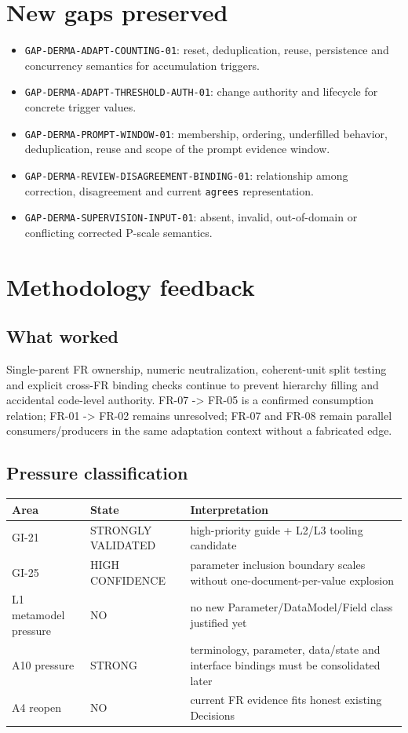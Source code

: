 \documentclass[11pt,a4paper]{article}
\begin{document}
\section{New gaps preserved}
\begin{itemize}
\item \texttt{GAP-DERMA-ADAPT-COUNTING-01}: reset, deduplication, reuse, persistence and concurrency semantics for accumulation triggers.
\item \texttt{GAP-DERMA-ADAPT-THRESHOLD-AUTH-01}: change authority and lifecycle for concrete trigger values.
\item \texttt{GAP-DERMA-PROMPT-WINDOW-01}: membership, ordering, underfilled behavior, deduplication, reuse and scope of the prompt evidence window.
\item \texttt{GAP-DERMA-REVIEW-DISAGREEMENT-BINDING-01}: relationship among correction, disagreement and current \texttt{agrees} representation.
\item \texttt{GAP-DERMA-SUPERVISION-INPUT-01}: absent, invalid, out-of-domain or conflicting corrected P-scale semantics.
\end{itemize}

\section{Methodology feedback}
\subsection{What worked}
Single-parent FR ownership, numeric neutralization, coherent-unit split testing and explicit cross-FR binding checks continue to prevent hierarchy filling and accidental code-level authority. FR-07 -> FR-05 is a confirmed consumption relation; FR-01 -> FR-02 remains unresolved; FR-07 and FR-08 remain parallel consumers/producers in the same adaptation context without a fabricated edge.

\subsection{Pressure classification}
\begin{tabularx}{\textwidth}{L{53mm}L{34mm}Y}\toprule
\textbf{Area} & \textbf{State} & \textbf{Interpretation}\\\midrule
GI-21 & STRONGLY VALIDATED & high-priority guide + L2/L3 tooling candidate\\
GI-25 & HIGH CONFIDENCE & parameter inclusion boundary scales without one-document-per-value explosion\\
L1 metamodel pressure & NO & no new Parameter/DataModel/Field class justified yet\\
A10 pressure & STRONG & terminology, parameter, data/state and interface bindings must be consolidated later\\
A4 reopen & NO & current FR evidence fits honest existing Decisions\\
\bottomrule\end{tabularx}
\end{document}
